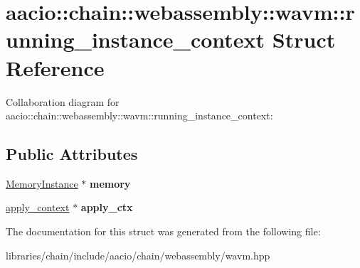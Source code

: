 \hypertarget{structaacio_1_1chain_1_1webassembly_1_1wavm_1_1running__instance__context}{}\section{aacio\+:\+:chain\+:\+:webassembly\+:\+:wavm\+:\+:running\+\_\+instance\+\_\+context Struct Reference}
\label{structaacio_1_1chain_1_1webassembly_1_1wavm_1_1running__instance__context}


Collaboration diagram for aacio\+:\+:chain\+:\+:webassembly\+:\+:wavm\+:\+:running\+\_\+instance\+\_\+context\+:
\subsection*{Public Attributes}
\begin{DoxyCompactItemize}
\item 
\mbox{\label{structaacio_1_1chain_1_1webassembly_1_1wavm_1_1running__instance__context_a07f04e32fdacc90c894b8c74b933081e}} 
\mbox{\hyperlink{struct_runtime_1_1_memory_instance}{Memory\+Instance}} $\ast$ {\bfseries memory}
\item 
\mbox{\label{structaacio_1_1chain_1_1webassembly_1_1wavm_1_1running__instance__context_afb3ca98a0433d8fced060943966896c0}} 
\mbox{\hyperlink{classaacio_1_1chain_1_1apply__context}{apply\+\_\+context}} $\ast$ {\bfseries apply\+\_\+ctx}
\end{DoxyCompactItemize}


The documentation for this struct was generated from the following file\+:\begin{DoxyCompactItemize}
\item 
libraries/chain/include/aacio/chain/webassembly/wavm.\+hpp\end{DoxyCompactItemize}
